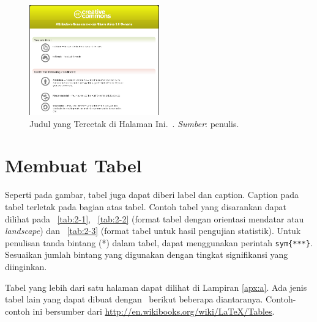 \begin{figure}
	\centering
	\includegraphics[width=0.50\textwidth]
		{pics/creative_common.png}
	\caption[Judul Gambar Tercetak di TOC]{Judul yang Tercetak di Halaman Ini.~\license. 
	{\small \emph{Sumber}: penulis.}}
	\label{fig:testGambar}
\end{figure}



\section{Membuat Tabel}
Seperti pada gambar, tabel juga dapat diberi label dan caption. 
Caption pada tabel terletak pada bagian atas tabel. 
Contoh tabel yang disarankan dapat dilihat pada \tab~\ref{tab:2-1}, \tab~\ref{tab:2-2} (format tabel dengan orientasi mendatar atau \emph{landscape}) dan \tab~\ref{tab:2-3} (format tabel untuk hasil pengujian statistik). Untuk penulisan tanda bintang (*) dalam tabel, dapat menggunakan perintah \texttt{\bslash sym\{***\}}. Sesuaikan jumlah bintang yang digunakan dengan tingkat signifikansi yang diinginkan.  

Tabel yang lebih dari satu halaman dapat dilihat di Lampiran \ref{apx:a}.
Ada jenis tabel lain yang dapat dibuat dengan \latex~berikut 
beberapa diantaranya. 
Contoh-contoh ini bersumber dari 
\url{http://en.wikibooks.org/wiki/LaTeX/Tables}.

